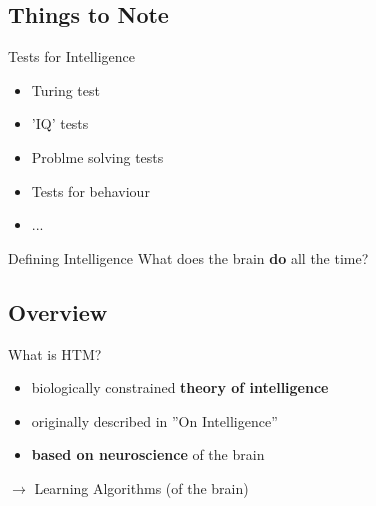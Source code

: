\subsection{Things to Note}


\begin{frame}[c]{Tests for Intelligence}
    \Large
    \begin{itemize}[<+(1)->]
        \item Turing test
        \item 'IQ' tests
        \item Problme solving tests
        \item Tests for behaviour
        \item ...
    \end{itemize}
\end{frame}


\begin{frame}[c]{Defining Intelligence}
    \pause
    \Huge
    What does the brain \textbf{do} \newline all the time?

    \vfill

    \phantom{Predict. Learn.}
\end{frame}

\subsection{Overview}


\begin{frame}[c]{What is HTM?}
    \begin{itemize}[<+(1)->]
        \item biologically constrained \textbf{theory of intelligence}
        \item originally described in ''On Intelligence''
        \item \textbf{based on neuroscience} of the brain
    \end{itemize}

    \vspace{0.5cm}

    \pause

    $\rightarrow$ Learning Algorithms \pause (of the brain)
\end{frame}


